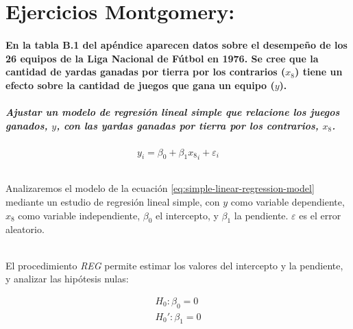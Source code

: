 \documentclass{article}
\begin{document}
  \maketitle

  \part{Ejercicios Montgomery:}

  \setcounter{section}{2}
  \subsection{En la tabla B.1 del apéndice aparecen datos sobre el desempeño de los 26 equipos de la Liga Nacional de Fútbol en 1976. Se cree que la cantidad de yardas ganadas por tierra por los contrarios ($x_8$) tiene un efecto sobre la cantidad de juegos que gana un equipo ($y$).}
  \subsubsection{Ajustar un modelo de regresión lineal simple que relacione los juegos ganados, $y$, con las yardas ganadas por tierra por los contrarios, $x_8$.}

  \begin{equation}
  \label{eq:simple-linear-regression-model}
    y_i = \beta_0 + \beta_1{x_8}_i + \varepsilon_i
  \end{equation}
  \paragraph{}
  Analizaremos el modelo de la ecuación \ref{eq:simple-linear-regression-model} mediante un estudio de regresión lineal simple, con $y$ como variable dependiente, $x_8$ como variable independiente, $\beta_0$ el intercepto, y $\beta_1$ la pendiente. $\varepsilon$ es el error aleatorio.

  \paragraph{}
  El procedimiento \textit{REG} permite estimar los valores del intercepto y la pendiente, y analizar las hipótesis nulas:

    \begin{align}
      H_0: \beta_0 = 0\\
      H_0': \beta_1 = 0
      \label{mont:hipotesisnulas}
    \end{align}
\end{document}
